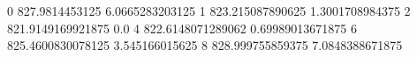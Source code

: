 0 827.9814453125 6.0665283203125
1 823.215087890625 1.3001708984375
2 821.9149169921875 0.0
4 822.6148071289062 0.69989013671875
6 825.4600830078125 3.545166015625
8 828.999755859375 7.0848388671875
